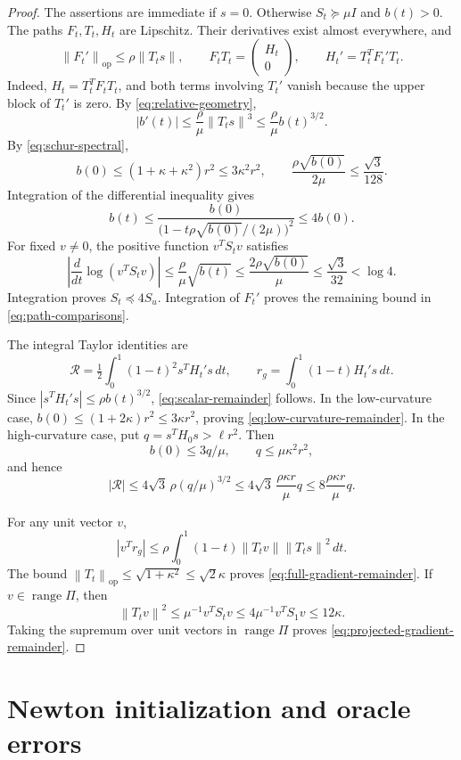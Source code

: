 \documentclass[11pt]{article}
\numberwithin{equation}{section}
\newcommand{\norm}[1]{\left\lVert#1\right\rVert}
\newcommand{\op}{\mathrm{op}}
\DeclareMathOperator{\range}{range}
\begin{document}
\begin{proof}
The assertions are immediate if $s=0$. Otherwise $S_t\succeq\mu I$
and $b(t)>0$. The paths $F_t,T_t,H_t$ are Lipschitz. Their derivatives
exist almost everywhere, and
\[
 \norm{F_t'}_{\op}\le\rho\norm{T_ts},\qquad
 F_tT_t=\begin{pmatrix}H_t\\0\end{pmatrix},\qquad
 H_t'=T_t^TF_t'T_t.
\]
Indeed, $H_t=T_t^TF_tT_t$, and both terms involving $T_t'$ vanish
because the upper block of $T_t'$ is zero.
By \eqref{eq:relative-geometry},
\[
 |b'(t)|\le\frac\rho\mu\norm{T_ts}^3
            \le\frac\rho\mu b(t)^{3/2}.
\]
By \eqref{eq:schur-spectral},
\[
 b(0)\le(1+\kappa+\kappa^2)r^2\le3\kappa^2r^2,
 \qquad \frac{\rho\sqrt{b(0)}}{2\mu}\le\frac{\sqrt3}{128}.
\]
Integration of the differential inequality gives
\[
 b(t)\le
 \frac{b(0)}{\bigl(1-t\rho\sqrt{b(0)}/(2\mu)\bigr)^2}
 \le4b(0).
\]
For fixed $v\ne0$, the positive function $v^TS_tv$ satisfies
\[
 \left|\frac{d}{dt}\log(v^TS_tv)\right|
 \le\frac\rho\mu\sqrt{b(t)}
 \le\frac{2\rho\sqrt{b(0)}}\mu
 \le\frac{\sqrt3}{32}<\log4.
\]
Integration proves $S_t\preceq4S_u$. Integration of $F_t'$ proves
the remaining bound in \eqref{eq:path-comparisons}.

The integral Taylor identities are
\[
 \mathcal R=\tfrac12\int_0^1(1-t)^2s^TH_t's\,dt,
 \qquad r_g=\int_0^1(1-t)H_t's\,dt.
\]
Since $|s^TH_t's|\le\rho b(t)^{3/2}$,
\eqref{eq:scalar-remainder} follows. In the low-curvature case,
$b(0)\le(1+2\kappa)r^2\le3\kappa r^2$, proving
\eqref{eq:low-curvature-remainder}. In the high-curvature case,
put $q=s^TH_0s>\ell r^2$. Then
\[
 b(0)\le3q/\mu,\qquad
 q\le\mu\kappa^2r^2,
\]
and hence
\[
 |\mathcal R|\le4\sqrt3\,\rho(q/\mu)^{3/2}
 \le4\sqrt3\,\frac{\rho\kappa r}{\mu}q
 \le8\frac{\rho\kappa r}{\mu}q.
\]

For any unit vector $v$,
\[
 |v^Tr_g|\le
 \rho\int_0^1(1-t)\norm{T_tv}\norm{T_ts}^2\,dt.
\]
The bound $\norm{T_t}_{\op}\le\sqrt{1+\kappa^2}\le\sqrt2\kappa$
proves \eqref{eq:full-gradient-remainder}.
If $v\in\range\Pi$, then
\[
 \norm{T_tv}^2\le\mu^{-1}v^TS_tv
 \le4\mu^{-1}v^TS_1v\le12\kappa.
\]
Taking the supremum over unit vectors in $\range\Pi$ proves
\eqref{eq:projected-gradient-remainder}.
\end{proof}

\section{Newton initialization and oracle errors}
\end{document}
